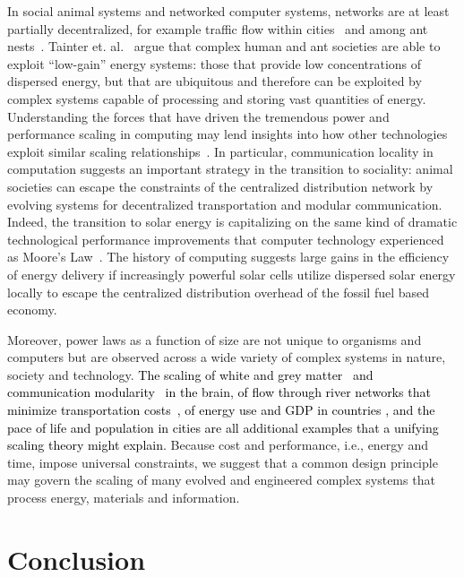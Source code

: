 \documentclass[12pt]{article}
\newcommand{\red}[1]{\textcolor{black}{#1}}
\begin{document}
In social animal systems and networked computer systems, networks
are at least partially decentralized, for example traffic flow within cities~\cite{samaniego2008cities} and among ant nests~\cite{flanagan2013fast}. Tainter et. al.~\cite{tainter2003resource} argue that complex human and ant societies are able to exploit ``low-gain'' energy systems: those that provide low concentrations of dispersed energy, but that are ubiquitous and therefore can be exploited by complex systems capable of processing and storing vast quantities of energy. Understanding the forces that have driven the tremendous power and performance scaling in computing may lend insights into how other technologies exploit similar scaling relationships~\cite{buchanan2016generalizing}. In particular, communication locality in computation suggests an important strategy in the transition to sociality: animal societies can escape the constraints of the centralized distribution network
by evolving systems for decentralized transportation and modular communication. Indeed, the transition to solar energy is capitalizing on the same kind of dramatic technological performance improvements that computer technology experienced as Moore's Law~\cite{farmer2016predictable}.  The history of computing suggests large gains in the efficiency of energy delivery if increasingly powerful solar cells utilize dispersed solar energy locally to escape the centralized distribution overhead of the fossil fuel based economy.
 
 Moreover, power laws as a function of size are not
unique to organisms and computers but are observed across a wide
variety of complex systems in nature, society and technology.  \red{The scaling of
white and grey matter~\cite{zhang00} and communication modularity~\cite{meunier2010modular} in the brain, of flow through river networks that minimize transportation costs~\cite{banavar2000topology}, of energy use and GDP in
countries \cite{brown11}, and the pace of life and population in cities
\cite{bettencourt07} are all additional examples that a unifying scaling theory might explain.}  Because cost and performance, i.e., energy and time, impose
universal constraints, we suggest that a common design principle may govern the
scaling of many evolved and engineered complex systems that process energy, materials and information.

\vspace{10 mm}
\section{Conclusion}
\end{document}
